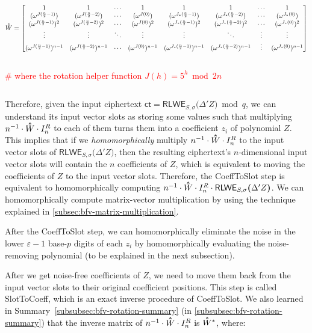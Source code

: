 $\hathat W = \begin{bmatrix}
1 & 1 & \cdots & 1 & 1 & 1 & \cdots & 1\\
(\omega^{J(\frac{n}{2} - 1)}) & (\omega^{J(\frac{n}{2} - 2)}) & \cdots & (\omega^{J(0)}) & (\omega^{J_*(\frac{n}{2} - 1)}) & (\omega^{J_*(\frac{n}{2} - 2)}) & \cdots & (\omega^{J_*(0)})\\
(\omega^{J(\frac{n}{2} - 1)})^2 & (\omega^{J(\frac{n}{2} - 2)})^2 & \cdots & (\omega^{J(0)})^2 & (\omega^{J_*(\frac{n}{2} - 1)})^2 & (\omega^{J_*(\frac{n}{2} - 2)})^2 & \cdots & (\omega^{J_*(0)})^2 \\
\vdots & \vdots & \ddots & \vdots & \vdots & \ddots & \vdots & \vdots \\
(\omega^{J(\frac{n}{2} - 1)})^{n-1} & (\omega^{J(\frac{n}{2} - 2)})^{n-1} & \cdots & (\omega^{J(0)})^{n-1} & (\omega^{J_*(\frac{n}{2} - 1)})^{n-1} & (\omega^{J_*(\frac{n}{2} - 2)})^{n-1} & \vdots  & (\omega^{J_*(0)})^{n-1}
\end{bmatrix}$

$ $

\textcolor{red}{ \# where the rotation helper function $J(h) = 5^h \bmod 2n$}

$ $

Therefore, given the input ciphertext $\textsf{ct} = \textsf{RLWE}_{S, \sigma}\bm(\Delta' Z\bm) \bmod q$, we can understand its input vector slots as storing some values such that multiplying $n^{-1}\cdot\hathat W \cdot I_n^R$ to each of them turns them into a coefficient $z_i$ of polynomial $Z$. This implies that if we \textit{homomorphically} multiply $n^{-1}\cdot\hathat W \cdot I_n^R$ to the input vector slots of $\textsf{RLWE}_{S, \sigma}\bm(\Delta' Z\bm)$, then the resulting ciphertext's $n$-dimensional input vector slots will contain the $n$ coefficients of $Z$, which is equivalent to moving the coefficients of $Z$ to the input vector slots. Therefore, the \textsf{CoeffToSlot} step is equivalent to homomorphically computing $n^{-1}\cdot\hathat W \cdot I_n^R \cdot \textsf{RLWE}_{S, \sigma}\bm(\Delta' Z\bm)$. We can homomorphically compute matrix-vector multiplication by using the technique explained in \autoref{subsec:bfv-matrix-multiplication}.

After the \textsf{CoeffToSlot} step, we can homomorphically eliminate the noise in the lower $\varepsilon-1$ base-$p$ digits of each $z_i$ by homomorphically evaluating the noise-removing polynomial (to be explained in the next subsection).  

After we get noise-free coefficients of $Z$, we need to move them back from the input vector slots to their original coefficient positions. This step is called \textsf{SlotToCoeff}, which is an exact inverse procedure of \textsf{CoeffToSlot}. We also learned in Summary~\ref*{subsubsec:bfv-rotation-summary} (in \autoref{subsubsec:bfv-rotation-summary}) that the inverse matrix of $n^{-1}\cdot\hathat W \cdot I_n^R$ is $\hathat{W}^*$, where: 

